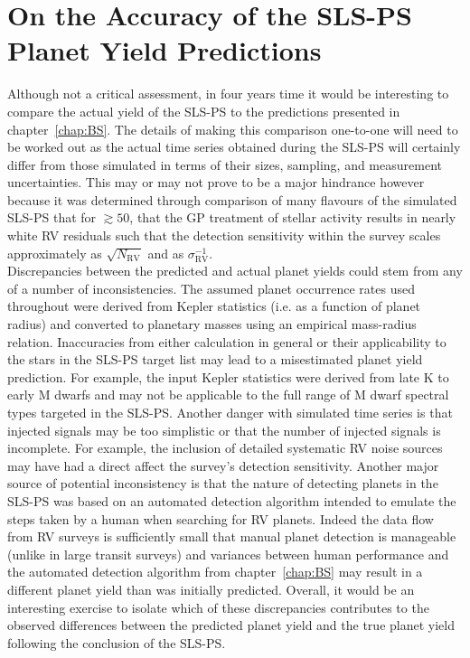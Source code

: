 \section{On the Accuracy of the SLS-PS Planet Yield Predictions}
Although not a critical assessment, in four years time it would be interesting
to compare the actual yield of the SLS-PS to the predictions presented in
chapter~\ref{chap:BS}. The details of making this comparison one-to-one will
need to be worked out as the actual time series obtained during the SLS-PS will
certainly differ from those simulated in terms of their sizes, sampling, and
measurement uncertainties. This may or may not prove to be a major hindrance
however because it was determined through comparison of many flavours of the
simulated SLS-PS that for \nrv{} $\gtrsim 50$, that the GP treatment of stellar
activity results in nearly white RV residuals such that the detection
sensitivity within the survey scales approximately as $\sqrt{N_{\text{RV}}}$ and
as $\sigma_{\text{RV}}^{-1}$. \\

Discrepancies between the predicted and actual planet yields could stem
from any of a number of inconsistencies. The assumed planet occurrence rates used
throughout were derived from Kepler statistics (i.e. as a function of planet 
radius) and converted to planetary masses
using an empirical mass-radius relation. Inaccuracies from either calculation
in general or their applicability to the stars in the SLS-PS target list may
lead to a misestimated planet yield prediction. For example, the input Kepler
statistics were derived from late K to early M dwarfs \citep{dressing15a} and
may not be applicable to the full range of M dwarf spectral types targeted in
the SLS-PS. Another danger with simulated time series is that injected signals
may be too simplistic or that the number of injected signals is incomplete. For
example, the inclusion of detailed systematic RV noise sources may have had a
direct affect the
survey's detection sensitivity. Another major source of potential inconsistency
is that the nature of detecting planets in the SLS-PS was based on an automated
detection algorithm intended to emulate the steps taken by a human when
searching for RV planets. Indeed the data flow from RV surveys is sufficiently
small that manual planet detection is manageable (unlike in large transit
surveys) and variances between human performance and the automated detection
algorithm from chapter~\ref{chap:BS} may result in a different planet yield than
was initially predicted. Overall, it would be an interesting exercise to
isolate which of these discrepancies contributes to the observed differences
between the predicted planet yield and the true planet yield following the
conclusion of the SLS-PS.


